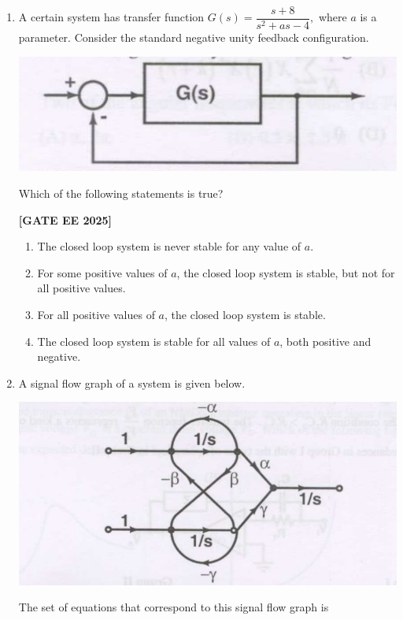 \documentclass[12pt]{article}
\begin{document}
\begin{enumerate}[leftmargin=*, label=\textbf{Q.\arabic*:}]
\item A certain system has transfer function $G(s) = \dfrac{s+8}{s^2 + a s - 4},$ where $a$ is a parameter. Consider the standard negative unity feedback configuration.

\begin{center}
\includegraphics[width=0.5\columnwidth]{figs/q39.png}
\end{center}

Which of the following statements is true?
 
\noindent \textbf{[GATE EE 2025]}
\begin{enumerate}
  \item The closed loop system is never stable for any value of $a$.
  \item For some positive values of $a$, the closed loop system is stable, but not for all positive values.
  \item For all positive values of $a$, the closed loop system is stable.
  \item The closed loop system is stable for all values of $a$, both positive and negative.
\end{enumerate}
\newpage
\item A signal flow graph of a system is given below.

\begin{center}
\includegraphics[width=0.5\columnwidth]{figs/q40.png}
\end{center}


The set of equations that correspond to this signal flow graph is
 

\end{enumerate}
\end{document}
